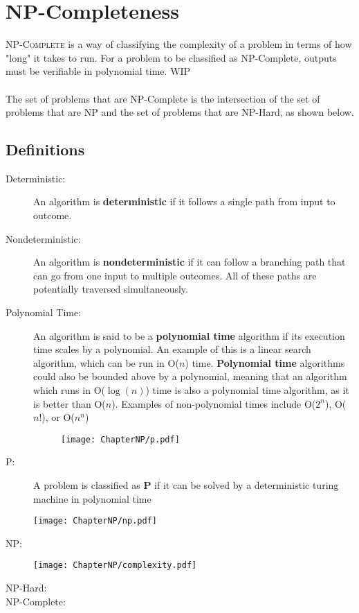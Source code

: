 \chapter{NP-Completeness}
\lettrine[lines=4]{N}{P-Complete} is a way of classifying the complexity of a problem in terms of how "long" it takes to run. For a problem to be classified as NP-Complete, outputs must be verifiable in polynomial time. WIP\\
\vspace {2cm}\\
The set of problems that are NP-Complete is the intersection of the set of problems that are NP and the set of problems that are NP-Hard, as shown below. 
\section{Definitions}
\begin{description}
    \item[Deterministic:] An algorithm is \textbf{deterministic} if it follows a single path from input to outcome.
    \item[Nondeterministic:]  An algorithm is \textbf{nondeterministic} if it can follow a branching path that can go from one input to multiple outcomes. All of these paths are potentially traversed simultaneously.
    \item[Polynomial Time:] An algorithm is said to be a \textbf{polynomial time} algorithm if its execution time scales by a polynomial. An example of this is a linear search algorithm, which can be run in O($n$) time. \textbf{Polynomial time} algorithms could also be bounded above by a polynomial, meaning that an algorithm which runs in O($\log(n)$) time is also a polynomial time algorithm, as it is better than O($n$). Examples of non-polynomial times include O($2^n$), O($n!$), or O($n^n$)
    \begin{figure}[H]
        \centering
        \texttt{[image: ChapterNP/p.pdf]} 
    \end{figure}
    \item[P:] A problem is classified as \textbf{P} if it can be solved by a deterministic turing machine in polynomial time
    \begin{center}
        \texttt{[image: ChapterNP/np.pdf]}
    \end{center} 
    \item[NP:]
    \begin{center}
        \texttt{[image: ChapterNP/complexity.pdf]}
    \end{center}
    \item[NP-Hard:]
    \item[NP-Complete:]   
\end{description}